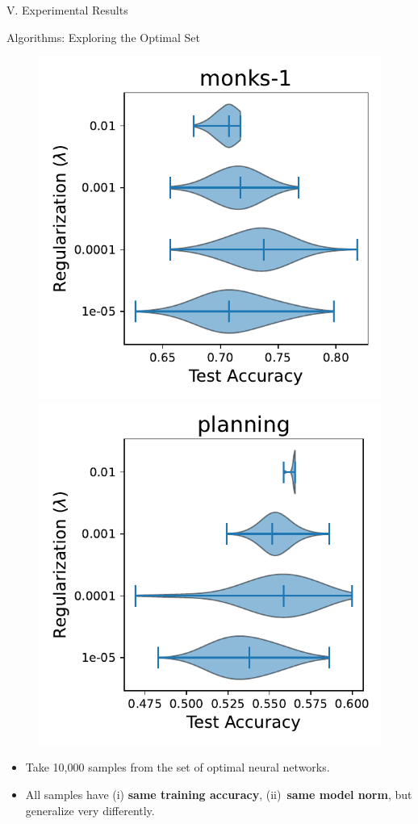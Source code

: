 \documentclass[usenames,dvipsnames,mathserif,notheorems]{beamer}
\begin{document}

\begin{frame}{}
	\begin{center}
		\huge V. Experimental Results
	\end{center}
\end{frame}

\begin{frame}{Algorithms: Exploring the Optimal Set}

	\begin{figure}[t]
		\centering
		\includegraphics[width=0.48\linewidth]{assets/dist_paper_monks-1.pdf}
		\includegraphics[width=0.48\linewidth]{assets/dist_paper_planning.pdf}
	\end{figure}
	\begin{itemize}
		\item Take 10,000 samples from the set of optimal neural networks.
		\item All samples have (i) \textbf{same training accuracy},
		      (ii)~\textbf{same model norm}, but generalize very differently.
	\end{itemize}
\end{frame}
\end{document}
